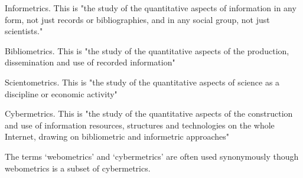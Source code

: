 \begin{list}{}{}
\item Informetrics. This is "the study of the quantitative aspects of information in any form, not just records or bibliographies, and in any social group, not just scientists."
\item Bibliometrics. This is "the study of the quantitative aspects of the production, dissemination and use of recorded information"
\item Scientometrics. This is "the study of the quantitative aspects of science as a discipline or
economic activity"
\item Cybermetrics. This is "the study of the quantitative aspects of the construction and use of information resources, structures and technologies on the whole Internet, drawing on bibliometric and informetric approaches"
\end{list}
The terms ‘webometrics’ and ‘cybermetrics’ are often used synonymously though webometrics is a subset of cybermetrics.

